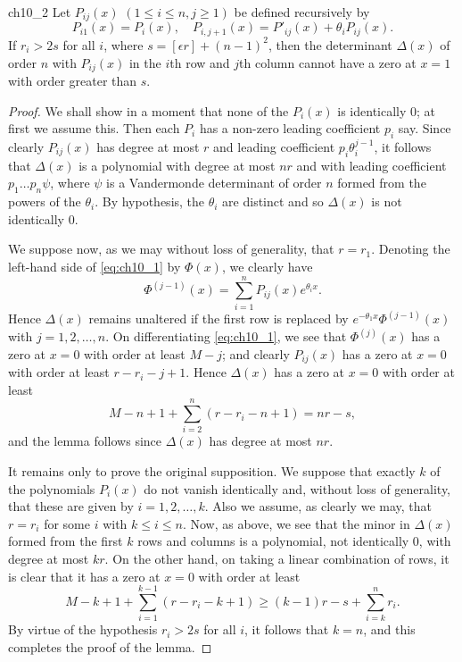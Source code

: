 \begin{mylemma}{}{ch10_2}
Let $P_{ij}(x)$ $(1 \le i \le n, j \ge 1)$ be defined recursively by
\[P_{i1}(x) = P_{i}(x), \quad P_{i,j+1}(x) = P'_{ij}(x) + \theta_i P_{ij}(x).\]
If $r_i > 2s$ for all $i$, where $s = [\epsilon r] + (n-1)^2$, then the determinant $\Delta(x)$ of order $n$ with $P_{ij}(x)$ in the $i$th row and $j$th column cannot have a zero at $x = 1$ with order greater than $s$.
\end{mylemma}

\begin{proof}
We shall show in a moment that none of the $P_i(x)$ is identically 0; at first we assume this. Then each $P_i$ has a non-zero leading coefficient $p_i$ say. Since clearly $P_{ij}(x)$ has degree at most $r$ and leading coefficient $p_i \theta_i^{j-1}$, it follows that $\Delta(x)$ is a polynomial with degree at most $nr$ and with leading coefficient $p_1 \dots p_n \psi$, where $\psi$ is a Vandermonde determinant of order $n$ formed from the powers of the $\theta_i$. By hypothesis, the $\theta_i$ are distinct and so $\Delta(x)$ is not identically 0.

We suppose now, as we may without loss of generality, that $r = r_1$. Denoting the left-hand side of \eqref{eq:ch10_1} by $\Phi(x)$, we clearly have
\[\Phi^{(j-1)}(x) = \sum_{i=1}^{n} P_{ij}(x) e^{\theta_i x}.\]
Hence $\Delta(x)$ remains unaltered if the first row is replaced by $e^{-\theta_1 x} \Phi^{(j-1)}(x)$ with $j=1,2,\ldots,n$. On differentiating \eqref{eq:ch10_1}, we see that $\Phi^{(j)}(x)$ has a zero at $x=0$ with order at least $M-j$; and clearly $P_{ij}(x)$ has a zero at $x=0$ with order at least $r-r_i-j+1$. Hence $\Delta(x)$ has a zero at $x=0$ with order at least
\[M-n+1+\sum_{i=2}^{n}(r-r_{i}-n+1)=nr-s,\]
and the lemma follows since $\Delta(x)$ has degree at most $nr$.

It remains only to prove the original supposition. We suppose that exactly $k$ of the polynomials $P_i(x)$ do not vanish identically and, without loss of generality, that these are given by $i=1,2,\dots,k$. Also we assume, as clearly we may, that $r=r_i$ for some $i$ with $k \le i \le n$. Now, as above, we see that the minor in $\Delta(x)$ formed from the first $k$ rows and columns is a polynomial, not identically 0, with degree at most $kr$. On the other hand, on taking a linear combination of rows, it is clear that it has a zero at $x=0$ with order at least
\[M-k+1+\sum_{i=1}^{k-1}(r-r_i-k+1) \ge (k-1)r-s+\sum_{i=k}^n r_i.\]
By virtue of the hypothesis $r_i > 2s$ for all $i$, it follows that $k = n$, and this completes the proof of the lemma.
\end{proof}

